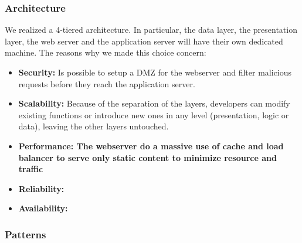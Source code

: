\subsubsection{Architecture}

We realized a 4-tiered architecture. In particular, the data layer, the presentation layer, the web server and the application server will have their own dedicated machine. The reasons why we made this choice concern:

\begin{itemize}
\item {\textbf{Security:}} Is possible to setup a DMZ for the webserver and filter malicious requests before they reach the application server.
\item {\textbf{Scalability:}} Because of the separation of the layers, developers can modify existing functions or introduce new ones in any level (presentation, logic or data), leaving the other layers untouched.
\item {\textbf{Performance: The webserver do a massive use of cache and load balancer to serve only static content to minimize resource and traffic}}
\item {\textbf{Reliability:}} 
\item {\textbf{Availability:}}
\end{itemize}


\subsubsection{Patterns}

